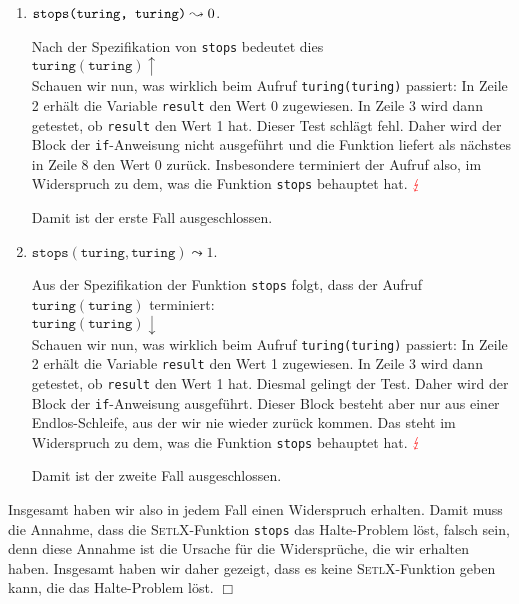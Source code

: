 \begin{enumerate}
\item $\texttt{stops(\texttt{turing}, \texttt{turing})} \leadsto 0$. 

      Nach der Spezifikation von \texttt{stops} bedeutet dies \\[0.1cm]
      \hspace*{1.3cm} $\texttt{turing}(\texttt{turing}) \uparrow$ \\[0.1cm]
      Schauen wir nun, was wirklich beim Aufruf \texttt{turing(\texttt{turing})} passiert:
      In Zeile 2 erhält die Variable \texttt{result} den Wert 0 zugewiesen.  In Zeile 3
      wird dann getestet, ob \texttt{result} den Wert 1 hat.  Dieser Test schlägt fehl.
      Daher wird der Block der \texttt{if}-Anweisung nicht ausgeführt und die Funktion liefert als
      nächstes in Zeile 8 den Wert 0 zurück.  Insbesondere terminiert der Aufruf also, im
      Widerspruch zu dem, was die Funktion \texttt{stops} behauptet hat. ${\color{red}\lightning}$

      Damit ist der erste Fall ausgeschlossen.
\item  $\mathtt{stops}(\texttt{turing}, \texttt{turing}) \leadsto 1$. 

      Aus der Spezifikation der Funktion \texttt{stops} folgt, dass der Aufruf
      $\texttt{turing}(\texttt{turing})$ terminiert: \\[0.1cm]
      \hspace*{1.3cm} $\mathtt{turing}(\texttt{turing}) \downarrow$ \\[0.1cm]
      Schauen wir nun, was wirklich beim Aufruf \texttt{turing(\texttt{turing})} passiert:
      In Zeile 2 erhält die Variable \texttt{result} den Wert 1 zugewiesen.  In Zeile 3
      wird dann getestet, ob \texttt{result} den Wert 1 hat.  Diesmal gelingt der Test.
      Daher wird der Block der \texttt{if}-Anweisung ausgeführt.  Dieser Block
      besteht aber nur aus einer Endlos-Schleife, aus der wir nie wieder zurück kommen.
      Das steht im Widerspruch zu dem, was die Funktion \texttt{stops} behauptet hat.
      ${\color{red}\lightning}$

      Damit ist der zweite Fall ausgeschlossen.
\end{enumerate}
Insgesamt haben wir also in jedem Fall einen Widerspruch erhalten.  
Damit muss die Annahme, dass die \textsc{SetlX}-Funktion \texttt{stops}
das Halte-Problem löst, falsch sein, denn diese Annahme ist die Ursache für die Widersprüche, die
wir erhalten haben.  Insgesamt haben wir daher gezeigt, dass es keine \textsc{SetlX}-Funktion
geben kann, die das Halte-Problem löst. \hspace*{\fill} $\Box$
\vspace*{0.3cm}


